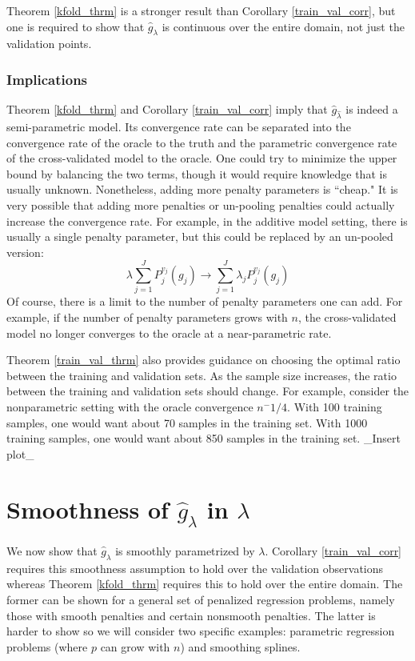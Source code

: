 \documentclass[12pt]{article}
\begin{document}
Theorem \ref{kfold_thrm} is a stronger result than Corollary \ref{train_val_corr}, but one is required to show that $\hat{g}_\lambda$ is continuous over the entire domain, not just the validation points.

\subsubsection{Implications}

Theorem \ref{kfold_thrm} and Corollary \ref{train_val_corr} imply that $\hat{g}_{\hat{\lambda}}$ is indeed a semi-parametric model. Its convergence rate can be separated into the convergence rate of the oracle to the truth and the parametric convergence rate of the cross-validated model to the oracle. One could try to minimize the upper bound by balancing the two terms, though it would require knowledge that is usually unknown. Nonetheless, adding more penalty parameters is ``cheap." It is very possible that adding more penalties or un-pooling penalties could actually increase the convergence rate. For example, in the additive model setting, there is usually a single penalty parameter, but this could be replaced by an un-pooled version:
\begin{equation}
\lambda \sum_{j=1}^J P_j^{v_j}(g_j) \rightarrow  \sum_{j=1}^J \lambda_j P_j^{v_j}(g_j)
\end{equation}
Of course, there is a limit to the number of penalty parameters one can add. For example, if the number of penalty parameters grows with $n$, the cross-validated model no longer converges to the oracle at a near-parametric rate.

Theorem \ref{train_val_thrm} also provides guidance on choosing the optimal ratio between the training and validation sets. As the sample size increases, the ratio between the training and validation sets should change. For example, consider the nonparametric setting with the oracle convergence $n^-1/4$. With 100 training samples, one would want about 70 samples in the training set. With 1000 training samples, one would want about 850 samples in the training set. \_Insert plot\_

\section{Smoothness of $\hat{g}_\lambda$ in $\lambda$}\label{sec:entropy}

We now show that $\hat{g}_\lambda$ is smoothly parametrized by $\lambda$. Corollary \ref{train_val_corr} requires this smoothness assumption to hold over the validation observations whereas Theorem \ref{kfold_thrm} requires this to hold over the entire domain. The former can be shown for a general set of penalized regression problems, namely those with smooth penalties and certain nonsmooth penalties. The latter is harder to show so we will consider two specific examples: parametric regression problems (where $p$ can grow with $n$) and smoothing splines.
\end{document}
